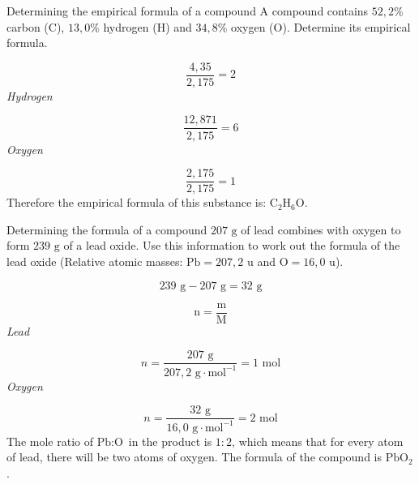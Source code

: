\begin{wex}{Determining the empirical formula of a compound }{
A compound contains $52,2\%$ carbon ($\text{C}$), $13,0\%$ hydrogen ($\text{H}$) and $34,8\%$ oxygen ($\text{O}$). Determine its empirical formula.      
}
{    \begin{equation*}
    \frac{4,35}{2,175}=2
      \end{equation*}
      \label{m38712*id281217}
        \textsl{Hydrogen}
     
      \label{m38712*id281223}\nopagebreak\noindent{}
        
    \begin{equation*}
    \frac{12,871}{2,175}=6
      \end{equation*}
      \label{m38712*id281254}
        \textsl{Oxygen}
      
      \label{m38712*id281261}\nopagebreak\noindent{}
        
    \begin{equation*}
    \frac{2,175}{2,175}=1
      \end{equation*}
      \label{m38712*id281292}Therefore the empirical formula of this substance is: ${\text{C}}_{2}{\text{H}}_{6}\text{O}$.
}
    \end{wex}
    \noindent
\label{m38712*secfhsst!!!underscore!!!id1235}
      \noindent
      \begin{wex}{Determining the formula of a compound }{
$207 \text{ g}$ of lead combines with oxygen to form $239 \text{ g}$ of a lead oxide. Use this information to work out the formula of the lead oxide (Relative atomic masses: $\text{Pb}=207,2 \text{ u}$ and $\text{O} = 16,0 \text{ u}$).
}
{
      \label{m38712*id281379}\nopagebreak\noindent{}
    \begin{equation*}
    239 \text{ g}-207 \text{ g}=32 \text{ g}
      \end{equation*}
      \label{m38712*id281407}\nopagebreak\noindent{}
        
    \begin{equation*}
    \text{n}=\frac{\text{m}}{\text{M}}
      \end{equation*}
      \label{m38712*id281427}
        \textsl{Lead}
       
      \label{m38712*id281433}\nopagebreak\noindent{}
        
    \begin{equation*}
    n = \frac{207 \text{ g}}{207,2 \text{ g} \cdot \text{mol}^{-1}}=1 \text{ mol}
      \end{equation*}
      \label{m38712*id281460}
        \textsl{Oxygen}
    
      \label{m38712*id281467}\nopagebreak\noindent{}
        
    \begin{equation*}
    n= \frac{32 \text{ g}}{16,0 \text{ g} \cdot \text{mol}^{-1}}=2 \text{ mol}
      \end{equation*}
      \label{m38712*id281498}The mole ratio of $\text{Pb}:\text{O}$ in the product is $1:2$, which means that for every atom of lead, there will be two atoms of oxygen. The formula of the compound is $\text{PbO}{}_{2}$. 
}
    \end{wex}
